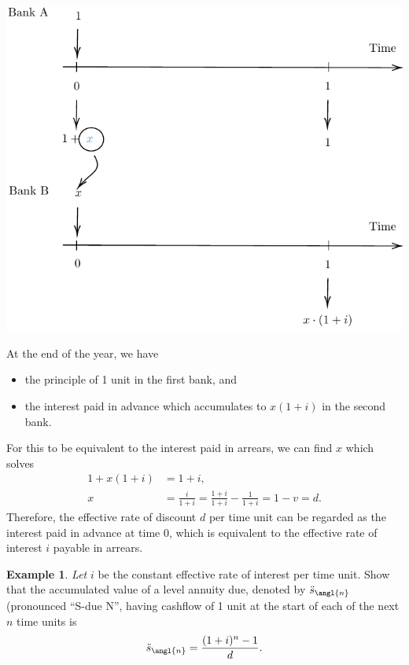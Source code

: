 \documentclass[
]{book}
\theoremstyle{definition}
\theoremstyle{definition}
\newtheorem{example}{Example}[chapter]
\theoremstyle{definition}
\theoremstyle{definition}
\theoremstyle{remark}
\begin{document}
\begin{center}\includegraphics{SCMA266Bookdownproj_files/figure-latex/tikz-ex15-1} \end{center}

At the end of the year, we have

\begin{itemize}
\item
  the principle of 1 unit in the first bank, and
\item
  the interest paid in advance which accumulates to \(x(1+i)\) in the
  second bank.
\end{itemize}

For this to be equivalent to the interest paid in arrears, we can find
\(x\) which solves \[\begin{aligned}
     1 + x(1+i) &= 1 + i,\\
     x &= \frac{i}{1+i} = \frac{1+i}{1+i} - \frac{1}{1+i}  = 1-v = d.\end{aligned}\]
Therefore, the effective rate of discount \(d\) per time unit can be
regarded as the interest paid in advance at time 0, which is equivalent
to the effective rate of interest \(i\) payable in arrears.

\begin{example}
\emph{Let} \(i\) be the constant effective rate of interest per time unit. Show
that the accumulated value of a level annuity due, denoted by
\(\ddot{s}_\angl{n}\) (pronounced ``S-due N'', having cashflow of 1 unit at
the start of each of the next \(n\) time units is
\[\ddot{s}_\angl{n} = \frac{(1+i)^n -1 }{d}.\]
\end{example}
\end{document}
